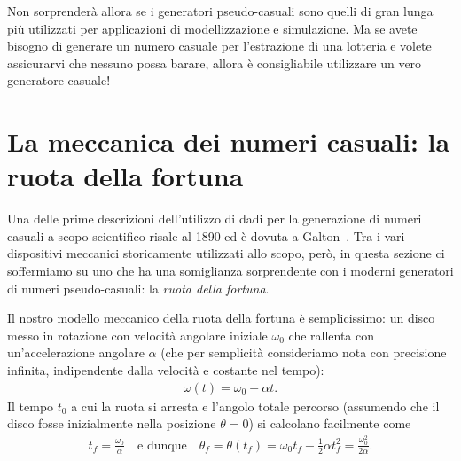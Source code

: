 Non sorprenderà allora se i generatori pseudo-casuali sono quelli di gran
lunga più utilizzati per applicazioni di modellizzazione e simulazione.
Ma se avete bisogno di generare un numero casuale per l'estrazione di una
lotteria e volete assicurarvi che nessuno possa barare, allora è consigliabile
utilizzare un vero generatore casuale!


\section{La meccanica dei numeri casuali: la ruota della fortuna}

Una delle prime descrizioni dell'utilizzo di dadi per la generazione di numeri
casuali a scopo scientifico risale al 1890 ed è dovuta a Galton~\cite{galton_dice}.
Tra i vari dispositivi meccanici storicamente utilizzati allo scopo, però, in
questa sezione ci soffermiamo su uno che ha una somiglianza sorprendente con
i moderni generatori di numeri pseudo-casuali: la \emph{ruota della fortuna}.

\begin{figure}[htb!]
\end{figure}

Il nostro modello meccanico della ruota della fortuna è semplicissimo: un
disco messo in rotazione con velocità angolare iniziale $\omega_0$ che rallenta
con un'accelerazione angolare $\alpha$ (che per semplicità consideriamo
nota con precisione infinita, indipendente dalla velocità e costante nel tempo):
\begin{align*}
  \omega(t) = \omega_0 - \alpha t.
\end{align*}
Il tempo $t_0$ a cui la ruota si arresta e l'angolo totale percorso (assumendo che
il disco fosse inizialmente nella posizione $\theta = 0$) si calcolano
facilmente come
\begin{align*}
  t_f = \frac{\omega_0}{\alpha} \quad \text{e dunque} \quad
  \theta_f = \theta(t_f) = \omega_0 t_f - \frac{1}{2}\alpha t_f^2 =
  \frac{\omega_0^2}{2\alpha}.
\end{align*}

